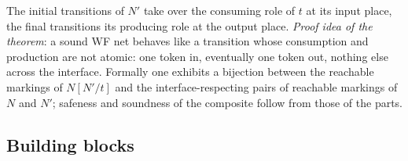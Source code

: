 The initial transitions of $N'$ take over the consuming role of $t$ at its input place, the final transitions its producing role at the output place. \emph{Proof idea of the theorem}: a sound WF net behaves like a transition whose consumption and production are not atomic: one token in, eventually one token out, nothing else across the interface. Formally one exhibits a bijection between the reachable markings of $N[N'/t]$ and the interface-respecting pairs of reachable markings of $N$ and $N'$; safeness and soundness of the composite follow from those of the parts.

\subsection{Building blocks}

